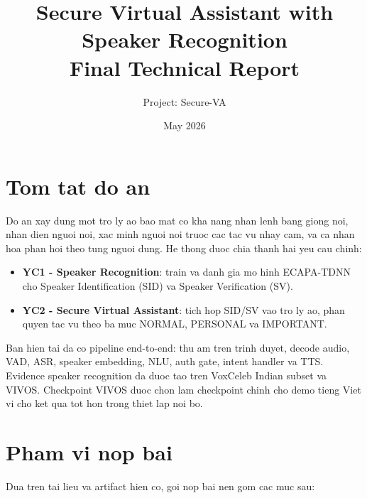 \documentclass[12pt,a4paper]{article}
\title{\textbf{Secure Virtual Assistant with Speaker Recognition}\\
\large Final Technical Report}
\author{Project: Secure-VA}
\date{May 2026}
\begin{document}
\maketitle
\tableofcontents
\newpage

\section{Tom tat do an}

Do an xay dung mot tro ly ao bao mat co kha nang nhan lenh bang giong noi,
nhan dien nguoi noi, xac minh nguoi noi truoc cac tac vu nhay cam, va ca nhan
hoa phan hoi theo tung nguoi dung. He thong duoc chia thanh hai yeu cau chinh:

\begin{itemize}
  \item \textbf{YC1 - Speaker Recognition}: train va danh gia mo hinh ECAPA-TDNN
  cho Speaker Identification (SID) va Speaker Verification (SV).
  \item \textbf{YC2 - Secure Virtual Assistant}: tich hop SID/SV vao tro ly ao,
  phan quyen tac vu theo ba muc NORMAL, PERSONAL va IMPORTANT.
\end{itemize}

Ban hien tai da co pipeline end-to-end: thu am tren trinh duyet, decode audio,
VAD, ASR, speaker embedding, NLU, auth gate, intent handler va TTS. Evidence
speaker recognition da duoc tao tren VoxCeleb Indian subset va VIVOS. Checkpoint
VIVOS duoc chon lam checkpoint chinh cho demo tieng Viet vi cho ket qua tot hon
trong thiet lap noi bo.

\section{Pham vi nop bai}

Dua tren tai lieu va artifact hien co, goi nop bai nen gom cac muc sau:
\end{document}
